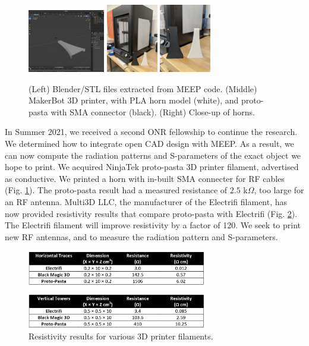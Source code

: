 \documentclass[11pt]{amsart}
\begin{document}
\begin{figure}
\centering
\includegraphics[width=0.3\textwidth]{figures/blender_example.png}
\includegraphics[width=0.2\textwidth]{figures/3dprinter.jpg}
\includegraphics[width=0.2\textwidth]{figures/3dprinter_2.jpg}
\caption{\label{fig:3d_print} (Left) Blender/STL files extracted from MEEP code.  (Middle) MakerBot 3D printer, with PLA horn model (white), and  proto-pasta with SMA connector (black). (Right) Close-up of horns.}
\end{figure}

In Summer 2021, we received a second ONR fellowship to continue the research.  We determined how to integrate open CAD design with MEEP.  As a result, we can now compute the radiation patterns and S-parameters of the exact object we hope to print.  We acquired NinjaTek proto-pasta 3D printer filament, advertised as conductive.  We printed a horn with in-built SMA connecter for RF cables (Fig. \ref{fig:3d_print}).  The proto-pasta result had a measured resistance of $2.5$ k$\Omega$, too large for an RF antenna.  Multi3D LLC, the manufacturer of the Electrifi filament, has now provided resistivity results that compare proto-pasta with Electrifi (Fig. \ref{fig:3d_print2}).  The Electrifi filament will improve resistivity by a factor of 120.  We seek to print new RF antennas, and to measure the radiation pattern and S-parameters. 

\begin{figure}[ht]
\centering
\includegraphics[width=0.7\textwidth,trim=0cm 0cm 0cm 7cm,clip=true]{figures/multi3dllc.png}
\caption{\label{fig:3d_print2} Resistivity results for various 3D printer filaments.}
\end{figure}
\end{document}
